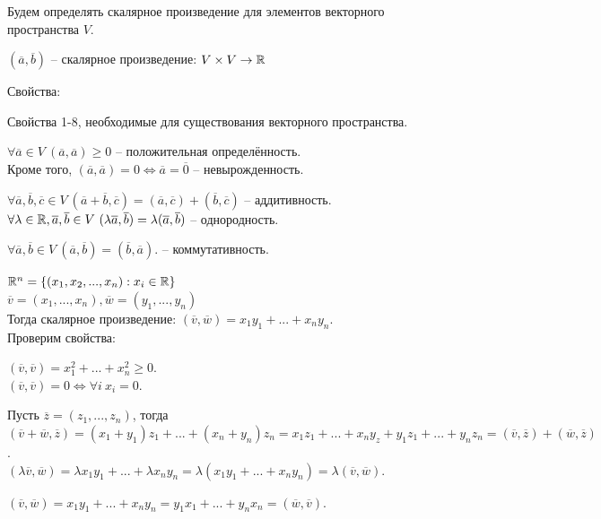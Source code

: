 	Будем определять скалярное произведение для элементов векторного пространства $V$.
	
	\begin{Def}
	  $(\overline{a}, \overline{b})$ -- скалярное произведение: $V \times V \to \mathbb{R}$
	\end{Def}
	
	Свойства:
	\begin{MyList}
		\item Свойства 1-8, необходимые для существования векторного пространства.
		\item $\forall \overline{a} \in V \ (\overline{a}, \overline{a}) \geqslant 0$ -- положительная определённость. \\
		Кроме того, $(\overline{a}, \overline{a}) = 0 \Leftrightarrow \overline{a} = \overline{0}$ -- невырожденность.
		\item $\forall \overline{a}, \overline{b}, \overline{c} \in V \ (\overline{a} + \overline{b}, \overline{c}) = (\overline{a}, \overline{c}) + (\overline{b}, \overline{c})$ -- аддитивность.\\
		$\forall \lambda \in \mathbb{R}, \overline{a}, \overline{b} \in V \ (\lambda \overline{a}, \overline{b}) = \lambda(\overline{a}, \overline{b})$ -- однородность.
		\item $\forall \overline{a}, \overline{b} \in V \ (\overline{a}, \overline{b}) = (\overline{b}, \overline{a})$. -- коммутативность.
	\end{MyList}
  
	\begin{Example}
	  $\mathbb{R}^n = \{ (x_1, x_2, ..., x_n): x_i \in \mathbb{R} \}$ \\
	  $\overline{v} = (x_1, ..., x_n), \overline{w} = (y_1, ..., y_n)$ \\
	  Тогда скалярное произведение: $(\overline{v}, \overline{w}) = x_1 y_1 + ... + x_n y_n.$ \\
	  Проверим свойства: 
	  \begin{MyList}
		\item $(\overline{v}, \overline{v}) = x_1^2 + ... + x_n^2 \geqslant 0$.\\
		$(\overline{v}, \overline{v}) = 0 \Leftrightarrow \forall i \ x_i = 0$.
		\item Пусть $ \overline{z} = (z_1, ..., z_n)$, тогда $(\overline{v} + \overline{w}, \overline{z}) = (x_1 + y_1)z_1 + ... + (x_n + y_n)z_n = x_1 z_1 + ... + x_n y_z + y_1 z_1 + ... + y_n z_n = (\overline{v}, \overline{z}) + (\overline{w}, \overline{z})$.\\
		$(\lambda \overline{v}, \overline{w}) = \lambda x_1 y_1 + ... + \lambda x_n y_n = \lambda (x_1 y_1 + ... + x_n y_n) = \lambda(\overline{v}, \overline{w})$.
		\item $(\overline{v}, \overline{w}) = x_1 y_1 + ... + x_n y_n = y_1 x_1 + ... + y_n x_n = (\overline{w}, \overline{v})$.
	  \end{MyList}
	\end{Example}
  

